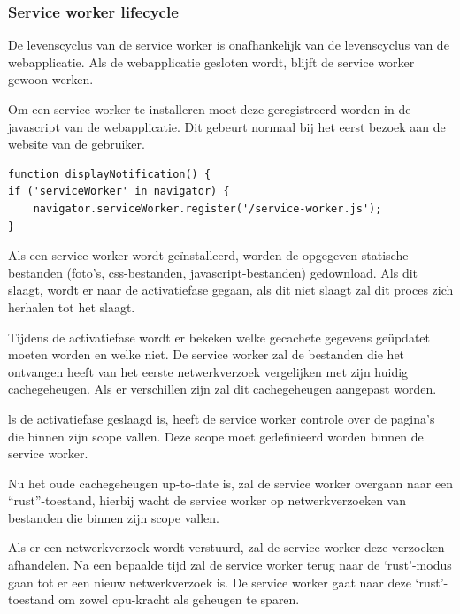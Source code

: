 	
	
		\subsubsection{Service worker lifecycle }
		De levenscyclus van de service worker is onafhankelijk van de levenscyclus van de webapplicatie. Als de webapplicatie gesloten wordt, blijft de service worker gewoon werken.
		
		Om een service worker te installeren moet deze geregistreerd worden in de javascript van de webapplicatie. Dit gebeurt normaal bij het eerst bezoek aan de website van de gebruiker.
		
\begin{lstlisting}
function displayNotification() {
if ('serviceWorker' in navigator) {
	navigator.serviceWorker.register('/service-worker.js');
}
\end{lstlisting}
	
		Als een service worker wordt geïnstalleerd, worden de opgegeven statische bestanden (foto’s, css-bestanden, javascript-bestanden) gedownload. Als dit slaagt, wordt er naar de activatiefase gegaan, als dit niet slaagt zal dit proces zich herhalen tot het slaagt. 
		
		Tijdens de activatiefase wordt er bekeken welke gecachete gegevens geüpdatet moeten worden en welke niet. De service worker zal de bestanden die het ontvangen heeft van het eerste netwerkverzoek vergelijken met zijn huidig cachegeheugen. Als er verschillen zijn zal dit cachegeheugen aangepast worden.
		
		ls de activatiefase geslaagd is, heeft de service worker controle over de pagina’s die binnen zijn scope vallen. Deze scope moet gedefinieerd worden binnen de service worker.
		
		Nu het oude cachegeheugen up-to-date is, zal de service worker overgaan naar een “rust”-toestand, hierbij wacht de service worker op netwerkverzoeken van bestanden die binnen zijn scope vallen.
		
		Als er een netwerkverzoek wordt verstuurd, zal de service worker deze verzoeken afhandelen. Na een bepaalde tijd zal de service worker terug naar de ‘rust’-modus gaan tot er een nieuw netwerkverzoek is. De service worker gaat naar deze ‘rust’-toestand om zowel cpu-kracht als geheugen te sparen.
		\autocite{Gaunt2019}
		
